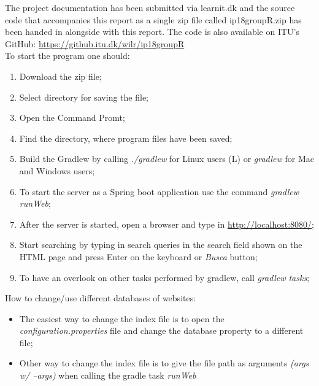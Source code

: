 The project documentation has been submitted via learnit.dk and the source code that accompanies this report as a single zip file called ip18groupR.zip has been handed in alongside with this report. The code is also available on ITU's GitHub: \url{https://github.itu.dk/wilr/ip18groupR}\\
To start the program one should:
\begin{enumerate}
    \item Download the zip file;
    \item Select directory for saving the file;
    \item Open the Command Promt;
    \item Find the directory, where program files have been saved;
    \item Build the Gradlew by calling  \textit{./gradlew} for Linux users (L) or \textit{gradlew} for Mac and Windows users;
    \item To start the server as a Spring boot application use the command \textit{gradlew runWeb};
    \item After the server is started, open a browser and type in \url{http://localhost:8080/};
    \item Start searching by typing in search queries in the search field shown on the HTML page and press Enter on the keyboard or \textit{Busca} button;
    \item To have an overlook on other tasks performed by gradlew, call \textit{gradlew tasks};
\end{enumerate}

How to change/use different databases of websites:
\begin{itemize}
    \item The easiest way to change the index file is to open the \textit{configuration.properties} file and change the database property to a different file;
    \item Other way to change the index file is to give the file path as arguments \textit{(args w/ --args)} when calling the gradle task \textit{runWeb}
\end{itemize}

